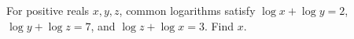 For positive reals $x,y,z$, common logarithms satisfy $\log x+\log y=2$, $\log y+\log z=7$, and $\log z+\log x=3$. Find $x$.

